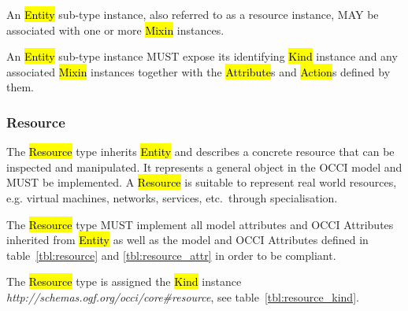 \documentclass[10pt,a4paper]{article}
\begin{document}
An \hl{Entity} sub-type instance, also referred to as a resource instance,
MAY be associated with one or more \hl{Mixin} instances.

An \hl{Entity} sub-type instance MUST expose its identifying \hl{Kind}
instance and any associated \hl{Mixin} instances together with the
\hl{Attribute}s and \hl{Action}s defined by them.

\subsubsection{Resource}
\label{sec:resource}
The \hl{Resource} type inherits \hl{Entity} and describes a concrete
resource that can be inspected and manipulated. It represents a
general object in the OCCI model and MUST be implemented. A
\hl{Resource} is suitable to represent real world resources,
e.g. virtual machines, networks, services, etc.~through
specialisation.

The \hl{Resource} type MUST implement all model attributes and OCCI Attributes
inherited from
\hl{Entity} as well as the model and OCCI Attributes defined in
table~\ref{tbl:resource} and \ref{tbl:resource_attr} in order to be compliant.
%
%

The \hl{Resource} type is assigned the \hl{Kind} instance
\textit{http://schemas.ogf.org/occi/core\#resource}, see
table~\ref{tbl:resource_kind}.
%
\end{document}
